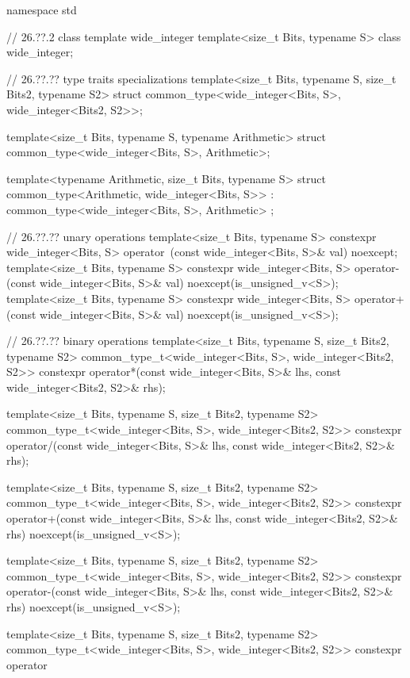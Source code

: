 \begin{codeblock}
namespace std {
    
  // 26.??.2 class template wide_integer
  template<size_t Bits, typename S> class wide_integer;
  
  // 26.??.?? type traits specializations
  template<size_t Bits, typename S, size_t Bits2, typename S2>
    struct common_type<wide_integer<Bits, S>, wide_integer<Bits2, S2>>;
  
  template<size_t Bits, typename S, typename Arithmetic>
    struct common_type<wide_integer<Bits, S>, Arithmetic>;
  
  template<typename Arithmetic, size_t Bits, typename S>
    struct common_type<Arithmetic, wide_integer<Bits, S>>
  : common_type<wide_integer<Bits, S>, Arithmetic>
  ;
  
  // 26.??.?? unary operations
  template<size_t Bits, typename S>
    constexpr wide_integer<Bits, S> operator~(const wide_integer<Bits, S>& val) noexcept;
  template<size_t Bits, typename S>
    constexpr wide_integer<Bits, S> operator-(const wide_integer<Bits, S>& val) noexcept(is_unsigned_v<S>);
  template<size_t Bits, typename S>
    constexpr wide_integer<Bits, S> operator+(const wide_integer<Bits, S>& val) noexcept(is_unsigned_v<S>);
  
  // 26.??.?? binary operations
  template<size_t Bits, typename S, size_t Bits2, typename S2>
  common_type_t<wide_integer<Bits, S>, wide_integer<Bits2, S2>>
    constexpr operator*(const wide_integer<Bits, S>& lhs, const wide_integer<Bits2, S2>& rhs);
  
  template<size_t Bits, typename S, size_t Bits2, typename S2>
  common_type_t<wide_integer<Bits, S>, wide_integer<Bits2, S2>>
    constexpr operator/(const wide_integer<Bits, S>& lhs, const wide_integer<Bits2, S2>& rhs);
  
  template<size_t Bits, typename S, size_t Bits2, typename S2>
  common_type_t<wide_integer<Bits, S>, wide_integer<Bits2, S2>>
    constexpr operator+(const wide_integer<Bits, S>& lhs,
                        const wide_integer<Bits2, S2>& rhs) noexcept(is_unsigned_v<S>);
  
  template<size_t Bits, typename S, size_t Bits2, typename S2>
  common_type_t<wide_integer<Bits, S>, wide_integer<Bits2, S2>>
    constexpr operator-(const wide_integer<Bits, S>& lhs,
                        const wide_integer<Bits2, S2>& rhs) noexcept(is_unsigned_v<S>);
  
  template<size_t Bits, typename S, size_t Bits2, typename S2>
  common_type_t<wide_integer<Bits, S>, wide_integer<Bits2, S2>>
    constexpr operator%
  
}
\end{codeblock}
